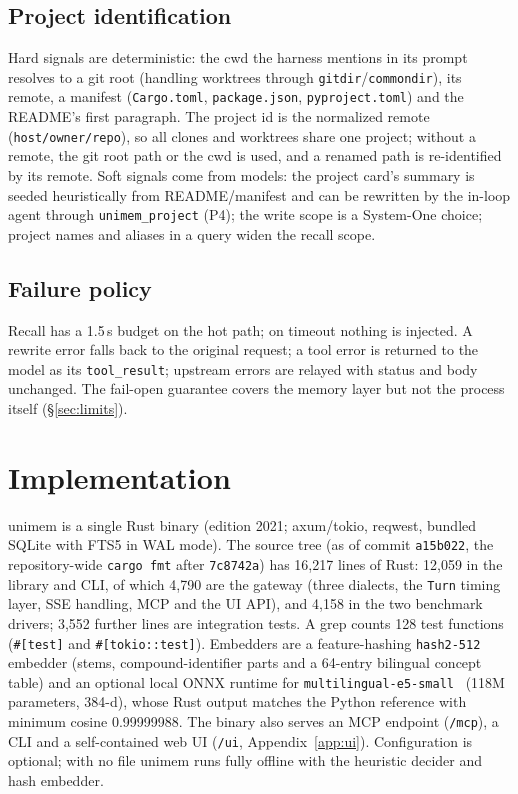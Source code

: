 \documentclass[10pt,twocolumn]{article}
\newcommand{\sys}{\textsf{unimem}}
\newcommand{\code}[1]{\texttt{\small #1}}
\begin{document}
\subsection{Project identification}
\label{sec:project}
Hard signals are deterministic: the cwd the harness mentions in its prompt resolves to a git root (handling worktrees
through \code{gitdir}/\code{commondir}), its remote, a manifest (\code{Cargo.toml}, \code{package.json},
\code{pyproject.toml}) and the README's first paragraph. The project id is the normalized remote
(\code{host/owner/repo}), so all clones and worktrees share one project; without a remote, the git root path or the cwd
is used, and a renamed path is re-identified by its remote. Soft signals come from models: the project card's summary
is seeded heuristically from README/manifest and can be rewritten by the in-loop agent through \code{unimem\_project}
(P4); the write scope is a System-One choice; project names and aliases in a query widen the recall scope.

\subsection{Failure policy}
Recall has a 1.5\,s budget on the hot path; on timeout nothing is injected. A rewrite error falls back to the original
request; a tool error is returned to the model as its \code{tool\_result}; upstream errors are relayed with status and
body unchanged. The fail-open guarantee covers the memory layer but not the process itself (\S\ref{sec:limits}).

\section{Implementation}
\label{sec:impl}
\sys{} is a single Rust binary (edition 2021; axum/tokio, reqwest, bundled SQLite with FTS5 in WAL mode). The source
tree (as of commit \code{a15b022}, the repository-wide \code{cargo fmt} after \code{7c8742a}) has 16,217 lines of Rust: 12,059 in the library and CLI, of which 4,790 are the gateway (three dialects, the
\code{Turn} timing layer, SSE handling, MCP and the UI API), and 4,158 in the two benchmark drivers; 3,552 further
lines are integration tests. A grep counts 128 test functions (\code{\#[test]} and \code{\#[tokio::test]}). Embedders are a
feature-hashing \code{hash2-512} embedder (stems, compound-identifier parts and a 64-entry bilingual concept table) and an
optional local ONNX runtime for \code{multilingual-e5-small}~\cite{e5} (118M parameters, 384-d), whose Rust output
matches the Python reference with minimum cosine 0.99999988. The binary also serves an MCP endpoint (\code{/mcp}), a
CLI and a self-contained web UI (\code{/ui}, Appendix~\ref{app:ui}). Configuration is optional; with no file \sys{} runs fully
offline with the heuristic decider and hash embedder.
\end{document}
